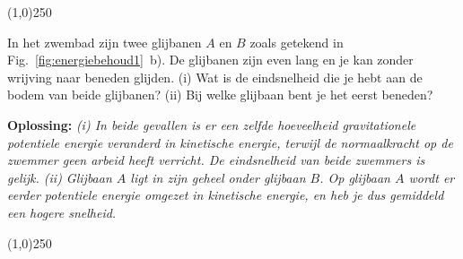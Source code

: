 \begin{center}
\line(1,0){250}
\end{center}

\begin{voorbeeld} 
In het zwembad zijn twee glijbanen  $A$ en $B$ zoals getekend in 
Fig.~\ref{fig:energiebehoud1}~b). De glijbanen zijn even lang en je kan zonder
wrijving naar beneden glijden. (i) Wat is de eindsnelheid die je hebt aan de bodem van 
beide glijbanen? (ii) Bij welke glijbaan bent je het eerst beneden?

{\bf Oplossing: }{\it (i) In beide gevallen is er een zelfde hoeveelheid gravitationele potentiele energie
veranderd in kinetische energie, terwijl de normaalkracht op de zwemmer geen arbeid heeft verricht. De
eindsnelheid van beide zwemmers is gelijk. (ii) Glijbaan $A$ ligt in zijn geheel onder glijbaan $B$. Op glijbaan
$A$ wordt er eerder potentiele energie omgezet in kinetische energie, en heb je dus gemiddeld een hogere
snelheid.} 
\end{voorbeeld}


\begin{center}
\line(1,0){250}
\end{center}


